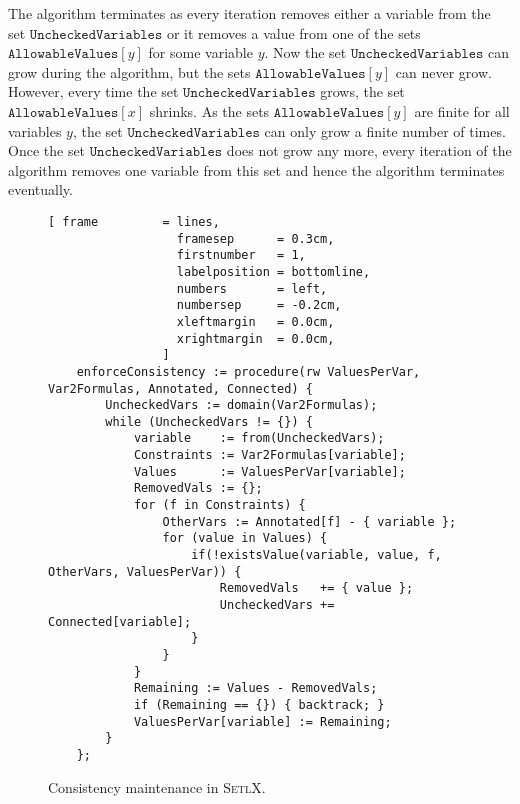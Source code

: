 The algorithm terminates as every iteration removes either a variable from the set
$\mathtt{UncheckedVariables}$ or it removes a value from one of the sets $\mathtt{AllowableValues}[y]$ for some
variable $y$.  Now the set $\mathtt{UncheckedVariables}$ can grow during the algorithm, but the sets 
$\mathtt{AllowableValues}[y]$ can never grow.  However, every time the set $\mathtt{UncheckedVariables}$ grows,
the set $\mathtt{AllowableValues}[x]$ shrinks.
As the sets $\mathtt{AllowableValues}[y]$ are finite for all variables $y$, the set
$\mathtt{UncheckedVariables}$ can only grow a finite number of times. 
Once the set $\mathtt{UncheckedVariables}$ does not grow any more, every iteration of the algorithm removes one
variable from this set and hence the algorithm terminates eventually.

\begin{figure}[!ht]
\centering
\begin{Verbatim}[ frame         = lines, 
                  framesep      = 0.3cm, 
                  firstnumber   = 1,
                  labelposition = bottomline,
                  numbers       = left,
                  numbersep     = -0.2cm,
                  xleftmargin   = 0.0cm,
                  xrightmargin  = 0.0cm,
                ]
    enforceConsistency := procedure(rw ValuesPerVar, Var2Formulas, Annotated, Connected) {
        UncheckedVars := domain(Var2Formulas);
        while (UncheckedVars != {}) {
            variable    := from(UncheckedVars);
            Constraints := Var2Formulas[variable];
            Values      := ValuesPerVar[variable];
            RemovedVals := {};
            for (f in Constraints) {
                OtherVars := Annotated[f] - { variable };
                for (value in Values) {
                    if(!existsValue(variable, value, f, OtherVars, ValuesPerVar)) {
                        RemovedVals   += { value };
                        UncheckedVars += Connected[variable];
                    }
                }
            }
            Remaining := Values - RemovedVals;
            if (Remaining == {}) { backtrack; }
            ValuesPerVar[variable] := Remaining;
        }
    };
\end{Verbatim}
\vspace*{-0.3cm}
\caption{Consistency maintenance in \textsc{SetlX}.}
\label{fig:csp-consistency.stlx:enforceConsistency}
\end{figure}

